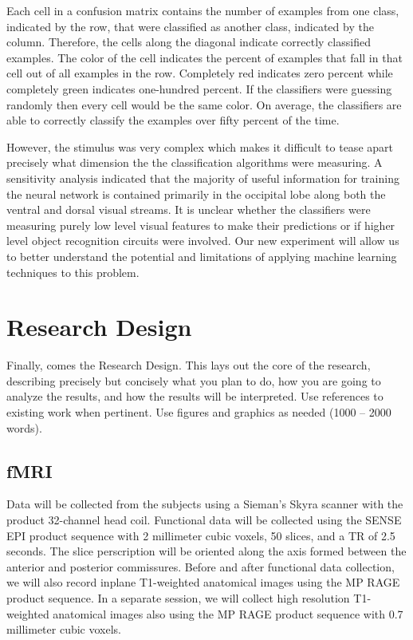\documentclass[12pt]{article}
\begin{document}
Each cell in a confusion matrix contains the number of examples from one class, indicated by the row, that were classified as another class, indicated by the column.
Therefore, the cells along the diagonal indicate correctly classified examples.
The color of the cell indicates the percent of examples that fall in that cell out of all examples in the row.
Completely red indicates zero percent while completely green indicates one-hundred percent.
If the classifiers were guessing randomly then every cell would be the same color.
On average, the classifiers are able to correctly classify the examples over fifty percent of the time.

However, the stimulus was very complex which makes it difficult to tease apart precisely what dimension the the classification algorithms were measuring.
A sensitivity analysis indicated that the majority of useful information for training the neural network is contained primarily in the occipital lobe along both the ventral and dorsal visual streams.
It is unclear whether the classifiers were measuring purely low level visual features to make their predictions or if higher level object recognition circuits were involved.
Our new experiment will allow us to better understand the potential and limitations of applying machine learning techniques to this problem.

\section{Research Design}
Finally, comes the Research Design. 
This lays out the core of the research, describing precisely but concisely what you plan to do, how you are going to analyze the results, and how the results will be interpreted. 
Use references to existing work when pertinent. 
Use figures and graphics as needed (1000 – 2000 words).

\subsection{fMRI}
Data will be collected from the subjects using a Sieman's Skyra scanner with the product 32-channel head coil.
Functional data will be collected using the SENSE EPI product sequence with 2 millimeter cubic voxels, 50 slices, and a TR of 2.5 seconds.
The slice perscription will be oriented along the axis formed between the anterior and posterior commissures.
Before and after functional data collection, we will also record inplane T1-weighted anatomical images using the MP RAGE product sequence.
In a separate session, we will collect high resolution T1-weighted anatomical images also using the MP RAGE product sequence with 0.7 millimeter cubic voxels.
\end{document}
